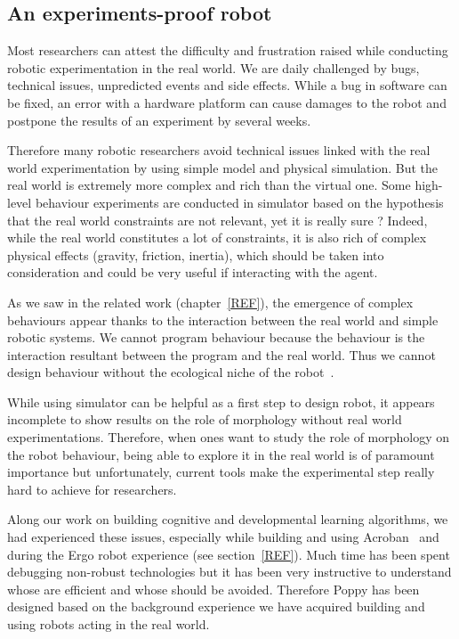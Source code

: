 \subsection{An experiments-proof robot} %

Most researchers can attest the difficulty and frustration raised while conducting robotic experimentation in the real world. We are daily challenged by bugs, technical issues, unpredicted events and side effects. While a bug in software can be fixed, an error with a hardware platform can cause damages to the robot and postpone the results of an experiment by several weeks.

Therefore many robotic researchers avoid technical issues linked with the real world experimentation by using simple model and physical simulation. But the real world is extremely more complex and rich than the virtual one.
Some high-level behaviour experiments are conducted in simulator based on the hypothesis that the real world constraints are not relevant, yet it is really sure ?
Indeed, while the real world constitutes a lot of constraints, it is also rich of complex physical effects (gravity, friction, inertia), which should be taken into consideration and could be very useful if interacting with the agent.

As we saw in the related work (chapter~\ref{REF}), the emergence of complex behaviours appear thanks to the interaction between the real world and simple robotic systems. We cannot program behaviour because the behaviour is the interaction resultant between the program and the real world. Thus we cannot design behaviour without the ecological niche of the robot~\cite{Steels1991emergence}.

While using simulator can be helpful as a first step to design robot, it appears incomplete to show results on the role of morphology without real world experimentations.
Therefore, when ones want to study the role of morphology on the robot behaviour, being able to explore it in the real world is of paramount importance but unfortunately, current tools make the experimental step really hard to achieve for researchers.

Along our work on building cognitive and developmental learning algorithms, we had experienced these issues, especially while building and using Acroban~\cite{Ly2010} and during the Ergo robot experience (see section~\ref{REF}). Much time has been spent debugging non-robust technologies but it has been very instructive to understand whose are efficient and whose should be avoided.
Therefore Poppy has been designed based on the background experience we have acquired building and using robots acting in the real world.

